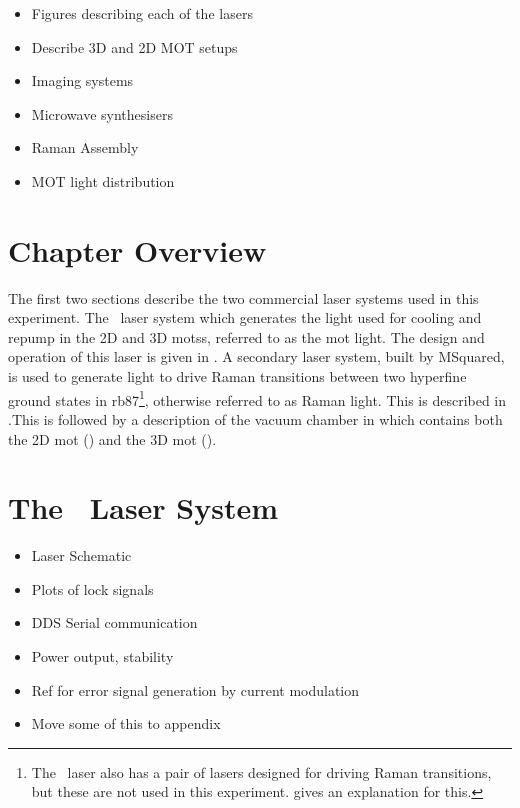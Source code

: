 \begin{itemize}\item Figures describing each of the lasers
    \item Describe 3D and 2D MOT setups  
    \item Imaging systems
    \item Microwave synthesisers
    \item Raman Assembly
    \item MOT light distribution
\end{itemize}
\section{Chapter Overview}\label{sec:setup_overview}
The first two sections describe the two commercial laser systems used in this experiment. The \Muquans\ laser system which generates the light used for cooling and repump in the 2D and 3D \acp{mots}, referred to as the \acs{mot} light. The design and operation of this laser is given in . A secondary laser system, built by MSquared, is used to generate light to drive Raman transitions between two hyperfine ground states in \ac{rb87}\footnote{The \Muquans\ laser also has a pair of lasers designed for driving Raman transitions, but these are not used in this experiment.  gives an explanation for this.}, otherwise referred to as Raman light. This is described in .This is followed by a description of the vacuum chamber in  which contains both the 2D \ac{mot} () and the 3D \ac{mot} ().  

\section{The \Muquans\ Laser System}\label{sec:setup_muquans}
\begin{itemize}
    \item Laser Schematic
    \item Plots of lock signals
    \item DDS Serial communication
    \item Power output, stability
    \item Ref for error signal generation by current modulation
    \item Move some of this to appendix
\end{itemize}

